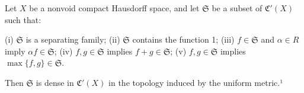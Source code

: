 Let $X$ be a nonvoid compact Hausdorff space, and let $\mathfrak{S}$ be a subset of $\mathfrak{C}'(X)$ such that:

(i) $\mathfrak{S}$ is a separating family;
(ii) $\mathfrak{S}$ contains the function 1;
(iii) $f \in \mathfrak{S}$ and $\alpha \in R$ imply $\alpha f \in \mathfrak{S}$;
(iv) $f, g \in \mathfrak{S}$ implies $f + g \in \mathfrak{S}$;
(v) $f, g \in \mathfrak{S}$ implies $\max\{f, g\} \in \mathfrak{S}$.

Then $\mathfrak{S}$ is dense in $\mathfrak{C}'(X)$ in the topology induced by the uniform metric.¹